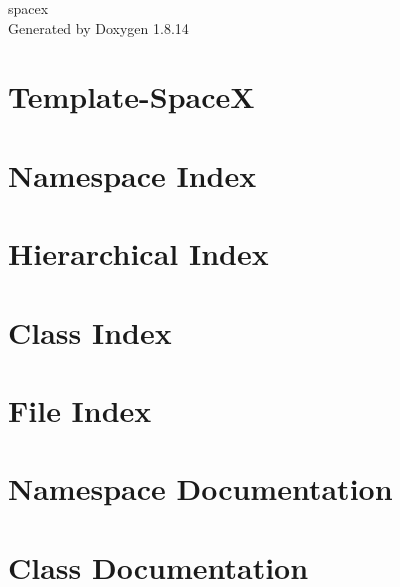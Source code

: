 \documentclass[twoside]{article}
\newcommand{\+}{\discretionary{\mbox{\scriptsize$\hookleftarrow$}}{}{}}
\begin{document}
\hypersetup{pageanchor=false,
             bookmarksnumbered=true,
             pdfencoding=unicode
            }
\begin{titlepage}
\vspace*{7cm}
\begin{center}%
{\Large spacex }\\
\vspace*{1cm}
{\large Generated by Doxygen 1.8.14}\\
\end{center}
\end{titlepage}
\tableofcontents
{}
\hypersetup{pageanchor=true}

\section{Template-\/\+SpaceX}
\label{md__r_e_a_d_m_e}

\section{Namespace Index}

\section{Hierarchical Index}

\section{Class Index}

\section{File Index}

\section{Namespace Documentation}


\section{Class Documentation}
























\end{document}
